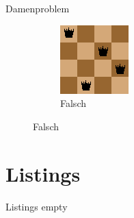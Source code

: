 \documentclass[aspectratio=43,t]{beamer}
\begin{document}
\begin{frame}{Damenproblem}
\begin{figure}[h!]
\begin{subfigure}{0.4\linewidth}
          \includegraphics[width=\linewidth]{../img/queensWrong.png}
          \caption{Falsch}
        \end{subfigure}
        \label{n4}
      \end{figure}

    \end{frame}


  \section{Listings}
  \begin{frame}[fragile]{Listings}
    empty
  \end{frame}
\end{document}
